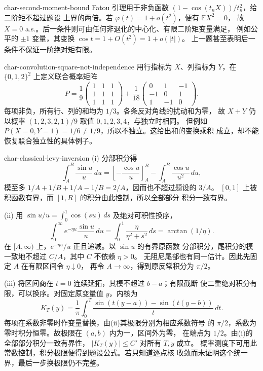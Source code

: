 \begin{solution}{char-second-moment-bound}
Fatou 引理用于非负函数 $(1-\cos(t_nX))/t_n^2$，给二阶矩不超过题设
上界的两倍。若 $\varphi(t)=1+o(t^2)$，便有 $\mathbb E X^2=0$，
故 $X=0$ a.s.。后一条件则可由任何非退化的中心化、有限二阶矩变量满足，
例如公平的 $\pm1$ 变量，其变换 $\cos t=1+O(t^2)=1+o(|t|)$。
上一题甚至表明后一条件不保证一阶绝对矩有限。
\end{solution}

\begin{solution}{char-convolution-square-not-independence}
用行指标为 $X$、列指标为 $Y$，在 $\{0,1,2\}^2$ 上定义联合概率矩阵
\[
 P=\frac19\begin{pmatrix}1&1&1\\1&1&1\\1&1&1\end{pmatrix}
 +\frac1{18}\begin{pmatrix}0&1&-1\\-1&0&1\\1&-1&0\end{pmatrix}.
\]
每项非负，所有行、列的和均为 $1/3$。各条反对角线的扰动和为零，
故 $X+Y$ 仍以概率 $(1,2,3,2,1)/9$ 取值 $0,1,2,3,4$，与独立时相同。
但例如 $P(X=0,Y=1)=1/6\ne1/9$，所以不独立。这给出和的变换乘积
成立，却不能恢复联合独立性的具体例子。
\end{solution}

\begin{solution}{char-classical-levy-inversion}
\textup{(i)} 分部积分得
\[
 \int_A^B\frac{\sin u}{u}\,du
 =\left[-\frac{\cos u}{u}\right]_A^B
       -\int_A^B\frac{\cos u}{u^2}\,du,
\]
模至多 $1/A+1/B+1/A-1/B=2/A$，因而也不超过题设的 $3/A$。
$[0,1]$ 上被积函数有界，而 $[1,R]$ 的积分由此控制，所以全部部分
积分一致有界。

\textup{(ii)} 用 $\sin u/u=\int_0^1\cos(su)\,ds$ 及绝对可积性换序，
\[
 \int_0^\infty e^{-\eta u}\frac{\sin u}{u}\,du
 =\int_0^1\frac{\eta}{\eta^2+s^2}\,ds=\arctan(1/\eta).
\]
在 $[A,\infty)$ 上，$e^{-\eta u}/u$ 正且递减。以 $\sin u$ 的有界原函数
分部积分，尾积分的模一致地不超过 $C/A$，其中 $C$ 不依赖 $\eta>0$。
无阻尼尾部也有同一估计。因此先固定 $A$ 在有限区间令 $\eta\downarrow0$，
再令 $A\to\infty$，得到原反常积分为 $\pi/2$。

\textup{(iii)} 将区间商在 $t=0$ 连续延拓，其模不超过 $b-a$；有限截断
使二重绝对积分有限，可以换序。对固定原变量值 $y$，内核为
\[
 K_T(y)=\frac1\pi\int_0^T
   \frac{\sin(t(y-a))-\sin(t(y-b))}{t}\,dt.
\]
每项在系数非零时作变量替换，由\textup{(ii)}其极限分别为相应系数符号
的 $\pi/2$，系数为零时积分恒零。故极限在 $(a,b)$ 内为一，区间外为零，
在端点为 $1/2$。由\textup{(i)}的全部部分积分一致有界性，
$|K_T(y)|\le C'$ 对所有 $T,y$ 成立。
概率测度下可用此常数控制，积分极限便得到题设公式。若只知道逐点核
收敛而未证明这个统一界，最后一步换极限仍不完整。
\end{solution}
